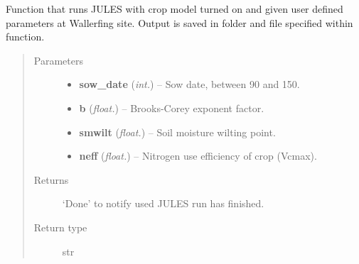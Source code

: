 \documentclass[letterpaper,10pt,english]{sphinxmanual}
\begin{document}
\begin{fulllineitems}
\label{source/sentinel_simulator.jules:sentinel_simulator.jules.py_jules.crop_run}
Function that runs JULES with crop model turned on and given user defined parameters at Wallerfing site. Output is
saved in folder and file specified within function.
\begin{quote}\begin{description}
\item[{Parameters}] \leavevmode\begin{itemize}
\item {} 
\textbf{sow\_date} (\emph{int.}) -- Sow date, between 90 and 150.

\item {} 
\textbf{b} (\emph{float.}) -- Brooks-Corey exponent factor.

\item {} 
\textbf{smwilt} (\emph{float.}) -- Soil moisture wilting point.

\item {} 
\textbf{neff} (\emph{float.}) -- Nitrogen use efficiency of crop (Vcmax).

\end{itemize}

\item[{Returns}] \leavevmode
`Done' to notify used JULES run has finished.

\item[{Return type}] \leavevmode
str

\end{description}\end{quote}

\end{fulllineitems}

\end{document}

